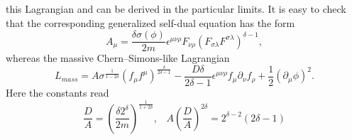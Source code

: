 \documentclass[a4 paper, 12 pt] {article}
\begin{document}
this Lagrangian and can be derived in the particular limits. It is easy
to check that the corresponding generalized self-dual equation has the
form
\begin{equation}
A_{\mu } = \frac{\delta \sigma (\phi ) }{2m} \epsilon^{\mu \nu \rho }
F_{\nu
\rho } (F_{\sigma \lambda }F^{\sigma \lambda } )^{\delta -1}
,
\label{dualmassivedyl}
\end{equation}
whereas the massive Chern--Simons-like Lagrangian
\begin{equation}
L_{mass}= A \sigma^{\frac{1}{1-2\delta }} (f_{\mu} f^{\mu}
)^{\frac{\delta }{2
\delta -1}} -
\frac{D \delta }{2\delta -1}
\epsilon^{\mu \nu \rho } f_{\mu } \partial_{\nu } f_{\rho }
+\frac{1}{2} (\partial_{\mu } \phi )^2.
\label{procamassivedyl}
\end{equation}
Here the constants read
\begin{equation}
\frac{D}{A}=\left(\frac{\delta 2^{\delta }}{2m}
\right)^{\frac{1}{1+2\delta }}, \; \; \;
A \left(\frac{D}{A} \right)^{2 \delta }=2^{\delta -2} (2\delta -1)
\label{const2}
\end{equation}
\end{document}
